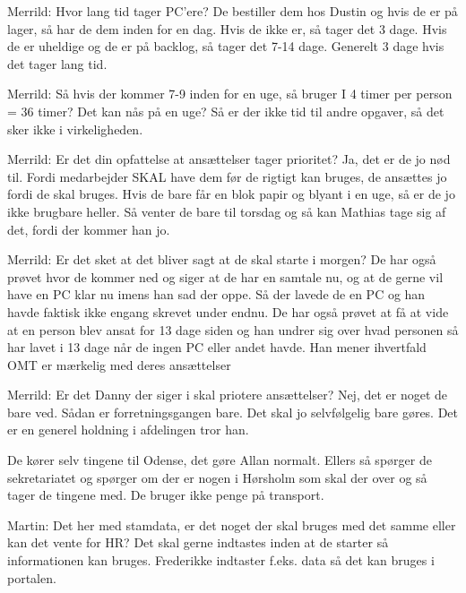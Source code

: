 Merrild: Hvor lang tid tager PC’ere?
De bestiller dem hos Dustin og hvis de er på lager, så har de dem inden for en dag. Hvis de ikke er, så tager det 3 dage. Hvis de er uheldige og de er på backlog, så tager det 7-14 dage. Generelt 3 dage hvis det tager lang tid. 

Merrild: Så hvis der kommer 7-9 inden for en uge, så bruger I 4 timer per person = 36 timer? Det kan nås på en uge?
Så er der ikke tid til andre opgaver, så det sker ikke i virkeligheden. 

Merrild: Er det din opfattelse at ansættelser tager prioritet?
Ja, det er de jo nød til. Fordi medarbejder SKAL have dem før de rigtigt kan bruges, de ansættes jo fordi de skal bruges. Hvis de bare får en blok papir og blyant i en uge, så er de jo ikke brugbare heller. Så venter de bare til torsdag og så kan Mathias tage sig af det, fordi der kommer han jo. 

Merrild: Er det sket at det bliver sagt at de skal starte i morgen?
De har også prøvet hvor de kommer ned og siger at de har en samtale nu, og at de gerne vil have en PC klar nu imens han sad der oppe. Så der lavede de en PC og han havde faktisk ikke engang skrevet under endnu.
De har også prøvet at få at vide at en person blev ansat for 13 dage siden og han undrer sig over hvad personen så har lavet i 13 dage når de ingen PC eller andet havde. Han mener ihvertfald OMT er mærkelig med deres ansættelser

Merrild: Er det Danny der siger i skal priotere ansættelser?
Nej, det er noget de bare ved. Sådan er forretningsgangen bare. Det skal jo selvfølgelig bare gøres. Det er en generel holdning i afdelingen tror han. 

De kører selv tingene til Odense, det gøre Allan normalt. Ellers så spørger de sekretariatet og spørger om der er nogen i Hørsholm som skal der over og så tager de tingene med. De bruger ikke penge på transport. 

Martin: Det her med stamdata, er det noget der skal bruges med det samme eller kan det vente for HR?
Det skal gerne indtastes inden at de starter så informationen kan bruges. Frederikke indtaster f.eks. data så det kan bruges i portalen. 
